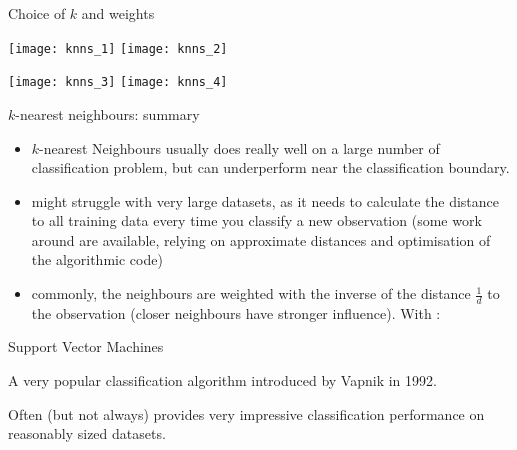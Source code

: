 \documentclass[compress]{beamer}
\begin{document}
\begin{frame}{Choice of $k$ and weights}

\begin{center}
    \texttt{[image: knns\_1]}
    \texttt{[image: knns\_2]}

    \texttt{[image: knns\_3]}
    \texttt{[image: knns\_4]}
\end{center}
\end{frame}


    \begin{frame}{$k$-nearest neighbours: summary}

\begin{itemize}
    \item<+-> $k$-nearest Neighbours usually does really well on a large number of
    classification problem, but can underperform near the classification
    boundary.

    \item<+-> might struggle with very large datasets, as it needs to calculate the
    distance to all training data every time you classify a new observation
    (some work around are available, relying on approximate distances and
    optimisation of the algorithmic code)

    \item<+-> commonly, the neighbours are weighted with the inverse of the
        distance $\frac{1}{d}$ to the observation (\ie closer neighbours have
        stronger influence). With :

\end{itemize}

\end{frame}

\begin{frame}{Support Vector Machines}

A very popular classification algorithm introduced by Vapnik in 1992.

\pause

Often (but not always) provides very impressive classification
performance on reasonably sized datasets.

\end{frame}
\end{document}
